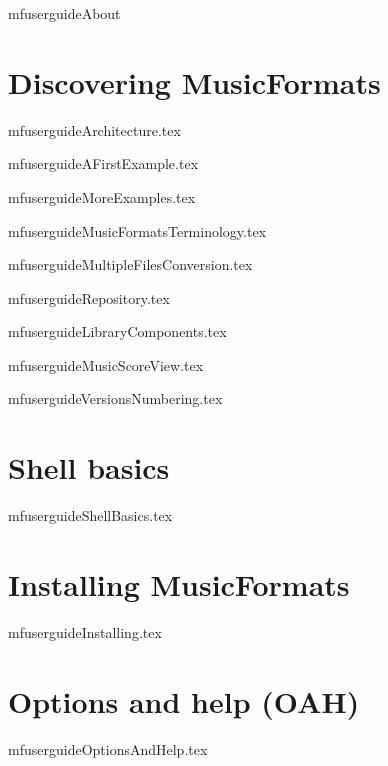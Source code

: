 \documentclass[11pt,a4paper]{report}
\begin{document}
{mfuserguideAbout}


\part{Discovering MusicFormats}

{mfuserguideArchitecture.tex}

{mfuserguideAFirstExample.tex}

{mfuserguideMoreExamples.tex}

{mfuserguideMusicFormatsTerminology.tex}

{mfuserguideMultipleFilesConversion.tex}

{mfuserguideRepository.tex}

{mfuserguideLibraryComponents.tex}

{mfuserguideMusicScoreView.tex}

{mfuserguideVersionsNumbering.tex}


\part{Shell basics}

{mfuserguideShellBasics.tex}


\part{Installing MusicFormats}

{mfuserguideInstalling.tex}


\part{Options and help (OAH)}

{mfuserguideOptionsAndHelp.tex}
\end{document}
